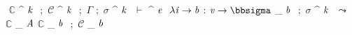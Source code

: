 {{}
{%
\ensuremath{}  \ensuremath{\mathbb{C}} ^{ \ensuremath{\Varid{k}} } \ensuremath{}  \ensuremath{;}  \ensuremath{\mathcal{C}} ^{ \ensuremath{\Varid{k}} } \ensuremath{}  \ensuremath{;}  \ensuremath{\Gamma }  \ensuremath{;}  \ensuremath{\sigma } ^{ \ensuremath{\Varid{k}} } \ensuremath{}  \ensuremath{\vdash } ^{ \ensuremath{\Varid{e}} } \ensuremath{}  \ensuremath{\lambda \Varid{i}\to \Varid{b}}  \ensuremath{\mathbin{:}}  \ensuremath{\Varid{v}\to \mathbb{\bbsigma}} _{ \ensuremath{\Varid{b}} } \ensuremath{}  \ensuremath{;}  \ensuremath{\sigma } ^{ \ensuremath{\Varid{k}} } \ensuremath{}  \ensuremath{\leadsto }  \ensuremath{\mathbb{C}} _{ \ensuremath{\Conid{A}} } \ensuremath{\mathbb{C}} _{ \ensuremath{\Varid{b}} } \ensuremath{}  \ensuremath{;}  \ensuremath{\mathcal{C}} _{ \ensuremath{\Varid{b}} } \ensuremath{}  \ensuremath{} 
}
}

